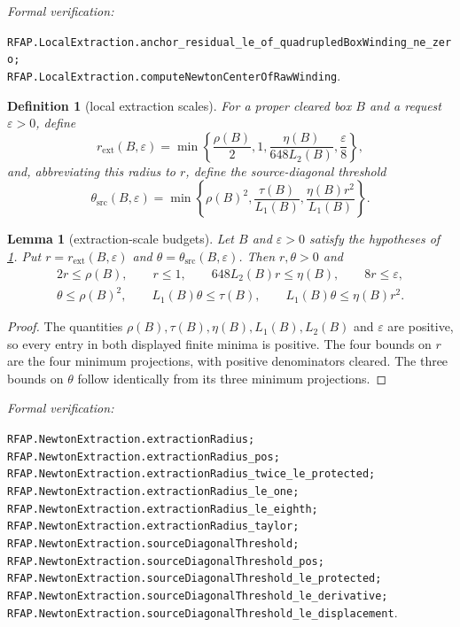 \documentclass[11pt]{article}
\newtheorem{lemma}[theorem]{Lemma}
\newtheorem{definition}[theorem]{Definition}
\newcommand{\eps}{\varepsilon}
\newcommand{\leanref}[1]{\par\smallskip\noindent
  \emph{Formal verification:}\par\nobreak
  {\raggedright\nolinkurl{#1}.\par}}
\begin{document}
\leanref{RFAP.LocalExtraction.anchor_residual_le_of_quadrupledBoxWinding_ne_zero;
RFAP.LocalExtraction.computeNewtonCenterOfRawWinding}

\begin{definition}[local extraction scales]
\label{def:local-extraction-scales}
For a proper cleared box $B$ and a request $\eps>0$, define
\[
 r_{\mathrm{ext}}(B,\eps)=
 \min\left\{\frac{\rho(B)}2,1,
       \frac{\eta(B)}{648L_2(B)},\frac\eps8\right\},
\]
and, abbreviating this radius to $r$, define the source-diagonal threshold
\[
 \theta_{\mathrm{src}}(B,\eps)=
 \min\left\{\rho(B)^2,
       \frac{\tau(B)}{L_1(B)},
       \frac{\eta(B)r^2}{L_1(B)}\right\}.
\]
\end{definition}

\begin{lemma}[extraction-scale budgets]
\label{lem:local-extraction-scale-budgets}
Let $B$ and $\eps>0$ satisfy the hypotheses of
\cref{def:local-extraction-scales}.  Put $r=r_{\mathrm{ext}}(B,\eps)$ and
$\theta=\theta_{\mathrm{src}}(B,\eps)$.  Then $r,\theta>0$ and
\[
\begin{gathered}
 2r\le\rho(B),\qquad r\le1,\qquad
 648L_2(B)r\le\eta(B),\qquad 8r\le\eps,\\
 \theta\le\rho(B)^2,\qquad
 L_1(B)\theta\le\tau(B),\qquad
 L_1(B)\theta\le\eta(B)r^2.
\end{gathered}
\]
\end{lemma}

\begin{proof}
The quantities $\rho(B),\tau(B),\eta(B),L_1(B),L_2(B)$ and $\eps$ are
positive, so every entry in both displayed finite minima is positive.  The
four bounds on $r$ are the four minimum projections, with positive
denominators cleared.  The three bounds on $\theta$ follow identically from
its three minimum projections.
\end{proof}

\leanref{RFAP.NewtonExtraction.extractionRadius;
RFAP.NewtonExtraction.extractionRadius_pos;
RFAP.NewtonExtraction.extractionRadius_twice_le_protected;
RFAP.NewtonExtraction.extractionRadius_le_one;
RFAP.NewtonExtraction.extractionRadius_le_eighth;
RFAP.NewtonExtraction.extractionRadius_taylor;
RFAP.NewtonExtraction.sourceDiagonalThreshold;
RFAP.NewtonExtraction.sourceDiagonalThreshold_pos;
RFAP.NewtonExtraction.sourceDiagonalThreshold_le_protected;
RFAP.NewtonExtraction.sourceDiagonalThreshold_le_derivative;
RFAP.NewtonExtraction.sourceDiagonalThreshold_le_displacement}
\end{document}
